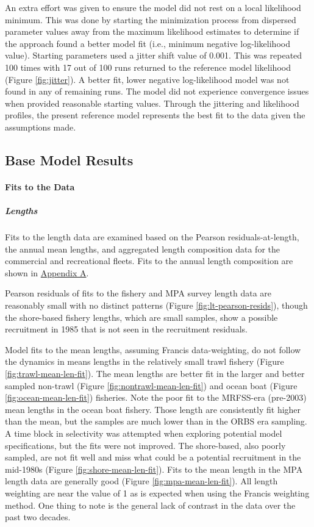 \documentclass[11pt,
  english,
  letterpaper,
]{article}
\begin{document}
An extra effort was given to ensure the model did not rest on a local likelihood minimum. This was done by starting the minimization process from dispersed parameter values away from the maximum likelihood estimates to determine if the approach found a better model fit (i.e., minimum negative log-likelihood value). Starting parameters used a jitter shift value of 0.001. This was repeated 100 times with 17 out of 100 runs returned to the reference model likelihood (Figure \ref{fig:jitter}). A better fit, lower negative log-likelihood model was not found in any of remaining runs. The model did not experience convergence issues when provided reasonable starting values. Through the jittering and likelihood profiles, the present reference model represents the best fit to the data given the assumptions made.

\hypertarget{base-model-results}{%
\subsection{Base Model Results}\label{base-model-results}}

\hypertarget{fits-to-the-data}{%
\paragraph{Fits to the Data}\label{fits-to-the-data}}

\hypertarget{lengths}{%
\subparagraph{Lengths}\label{lengths}}

Fits to the length data are examined based on the Pearson residuals-at-length, the annual mean lengths, and aggregated length composition data for the commercial and recreational fleets. Fits to the annual length composition are shown in \protect\hyperlink{app_a}{Appendix A}.

Pearson residuals of fits to the fishery and MPA survey length data are reasonably small with no distinct patterns (Figure \ref{fig:lt-pearson-resids}), though the shore-based fishery lengths, which are small samples, show a possible recruitment in 1985 that is not seen in the recruitment residuals.

Model fits to the mean lengths, assuming Francis data-weighting, do not follow the dynamics in means lengths in the relatively small trawl fishery (Figure \ref{fig:trawl-mean-len-fit}). The mean lengths are better fit in the larger and better sampled non-trawl (Figure \ref{fig:nontrawl-mean-len-fit}) and ocean boat (Figure \ref{fig:ocean-mean-len-fit}) fisheries. Note the poor fit to the MRFSS-era (pre-2003) mean lengths in the ocean boat fishery. Those length are consistently fit higher than the mean, but the samples are much lower than in the ORBS era sampling. A time block in selectivity was attempted when exploring potential model specifications, but the fits were not improved. The shore-based, also poorly sampled, are not fit well and miss what could be a potential recruitment in the mid-1980s (Figure \ref{fig:shore-mean-len-fit}). Fits to the mean length in the MPA length data are generally good (Figure \ref{fig:mpa-mean-len-fit}). All length weighting are near the value of 1 as is expected when using the Francis weighting method. One thing to note is the general lack of contrast in the data over the past two decades.
\end{document}
